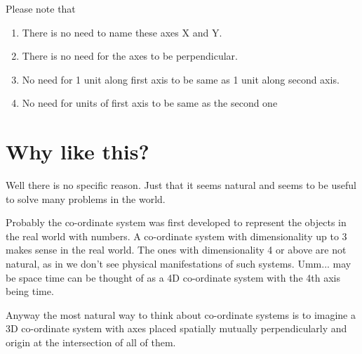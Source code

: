 \documentclass[12pt]{article}
\begin{document}
Please note that
\begin{enumerate}
  \item There is no need to name these axes X and Y.
  \item There is no need for the axes to be perpendicular.
  \item No need for 1 unit along first axis to be same as 1 unit along second axis.
  \item No need for units of first axis to be same as the second one
\end{enumerate}

\section{Why like this?}
Well there is no specific reason. Just that it seems natural and seems to be useful to solve many problems in the world.

Probably the co-ordinate system was first developed to represent the objects in the real world with numbers. A co-ordinate system with dimensionality up to 3 makes sense in the real world. The ones with dimensionality 4 or above are not natural, as in we don't see physical manifestations of such systems. Umm... may be space time can be thought of as a 4D co-ordinate system with the 4th axis being time.

Anyway the most natural way to think about co-ordinate systems is to imagine a 3D co-ordinate system with axes placed spatially mutually perpendicularly and origin at the intersection of all of them.
\end{document}

